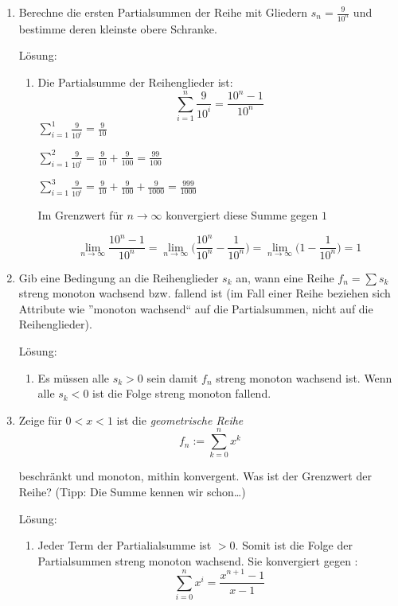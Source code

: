 \documentclass[main.tex]{subfiles}
\begin{document}
\begin{enumerate}
	\item Berechne die ersten Partialsummen der Reihe mit Gliedern \( s_n = \frac{9}{10^n} \) und
	      bestimme deren kleinste obere Schranke.

	      Lösung:
	      \begin{enumerate}
		      \item Die Partialsumme der Reihenglieder ist:
		            \[ \sum_{i = 1}^{n} \frac{9}{10^i}  = \frac{10^n - 1}{10^n}\]
		            \( \sum_{i = 1}^{1} \frac{9}{10^i} = \frac{9}{10} \)

		            \( \sum_{i = 1}^{2} \frac{9}{10^i} =\frac{9}{10} + \frac{9}{100} = \frac{99}{100} \)

		            \( \sum_{i = 1}^{3} \frac{9}{10^i} = \frac{9}{10} + \frac{9}{100} + \frac{9}{1000} = \frac{999}{1000} \)

		            Im Grenzwert für \( n \to \infty \) konvergiert diese Summe gegen \( 1 \)

		            \[ \lim_{n \to \infty} \frac{10^n - 1}{10^n}
			            = \lim_{n \to \infty} \Big( \frac{10^n}{10^n} - \frac{1}{10^n} \Big)
			            = \lim_{n \to \infty} \Big( 1 - \frac{1}{10^n} \Big) = 1\]
	      \end{enumerate}
	\item Gib eine Bedingung an die Reihenglieder \( s_k \) an, wann eine Reihe \( f_n = \sum s_k \)
	      streng monoton wachsend bzw. fallend ist (im Fall einer Reihe beziehen sich
	      Attribute wie ”monoton wachsend“ auf die Partialsummen, nicht auf die
	      Reihenglieder).

	      Lösung:
	      \begin{enumerate}
		      \item Es müssen alle \( s_k > 0 \) sein damit \( f_n \) streng monoton wachsend ist.
		            Wenn alle \( s_k < 0 \) ist die Folge streng monoton fallend.
	      \end{enumerate}
	\item Zeige für \( 0 < x < 1  \) ist die \textit{geometrische Reihe}
	      \[ f_n := \sum_{k = 0}^{n} x^k \]

	      beschränkt und monoton, mithin konvergent. Was ist der Grenzwert der Reihe?
	      (Tipp: Die Summe kennen wir schon\dots )

	      Lösung:
	      \begin{enumerate}
		      \item Jeder Term der Partialialsumme ist \(  > 0 \). Somit ist die Folge der Partialsummen
		            streng monoton wachsend. Sie konvergiert gegen :
		            \[ \sum_{i = 0}^{n} x^i = \frac{x^{n+1} - 1}{x - 1} \]


\end{enumerate}
\end{enumerate}
\end{document}
